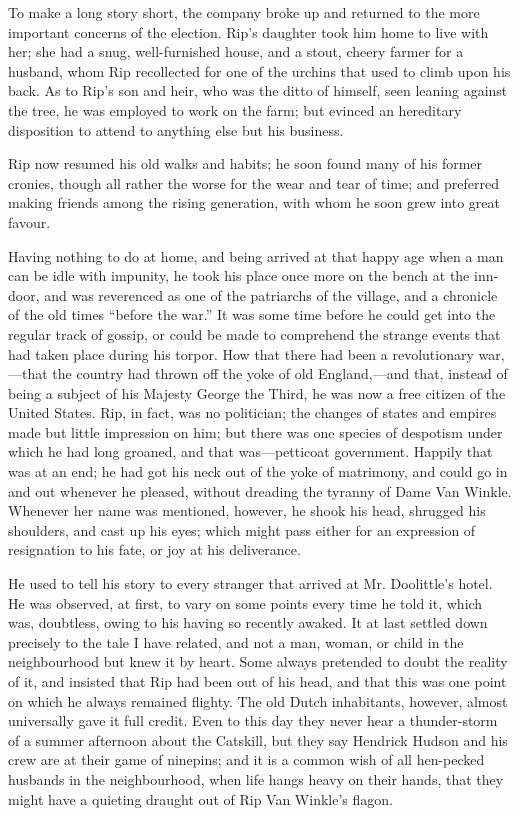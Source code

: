 To make a long story short, the company broke up and returned to the more important concerns of the election. Rip’s daughter took him home to live with her; she had a snug, well-furnished house, and a stout, cheery farmer for a husband, whom Rip recollected for one of the urchins that used to climb upon his back. As to Rip’s son and heir, who was the ditto of himself, seen leaning against the tree, he was employed to work on the farm; but evinced an hereditary disposition to attend to anything else but his business.

Rip now resumed his old walks and habits; he soon found many of his former cronies, though all rather the worse for the wear and tear of time; and preferred making friends among the rising generation, with whom he soon grew into great favour.

Having nothing to do at home, and being arrived at that happy age when a man can be idle with impunity, he took his place once more on the bench at the inn-door, and was reverenced as one of the patriarchs of the village, and a chronicle of the old times “before the war.” It was some time before he could get into the regular track of gossip, or could be made to comprehend the strange events that had taken place during his torpor. How that there had been a revolutionary war,—that the country had thrown off the yoke of old England,—and that, instead of being a subject of his Majesty George the Third, he was now a free citizen of the United States. Rip, in fact, was no politician; the changes of states and empires made but little impression on him; but there was one species of despotism under which he had long groaned, and that was—petticoat government. Happily that was at an end; he had got his neck out of the yoke of matrimony, and could go in and out whenever he pleased, without dreading the tyranny of Dame Van Winkle. Whenever her name was mentioned, however, he shook his head, shrugged his shoulders, and cast up his eyes; which might pass either for an expression of resignation to his fate, or joy at his deliverance.

He used to tell his story to every stranger that arrived at Mr. Doolittle’s hotel. He was observed, at first, to vary on some points every time he told it, which was, doubtless, owing to his having so recently awaked. It at last settled down precisely to the tale I have related, and not a man, woman, or child in the neighbourhood but knew it by heart. Some always pretended to doubt the reality of it, and insisted that Rip had been out of his head, and that this was one point on which he always remained flighty. The old Dutch inhabitants, however, almost universally gave it full credit. Even to this day they never hear a thunder-storm of a summer afternoon about the Catskill, but they say Hendrick Hudson and his crew are at their game of ninepins; and it is a common wish of all hen-pecked husbands in the neighbourhood, when life hangs heavy on their hands, that they might have a quieting draught out of Rip Van Winkle’s flagon.

